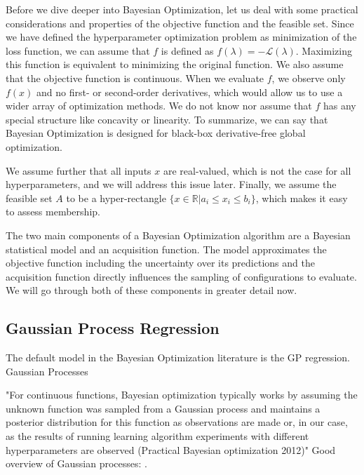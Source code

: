 Before we dive deeper into Bayesian Optimization, let us deal with some practical considerations and properties of the objective function and the feasible set. Since we have defined the hyperparameter optimization problem as minimization of the loss function, we can assume that $f$ is defined as $f(\lambda)=-\mathcal{L}(\lambda)$. Maximizing this function is equivalent to minimizing the original function. We also assume that the objective function is continuous. When we evaluate $f$, we observe only $f(x)$ and no first- or second-order derivatives, which would allow us to use a wider array of optimization methods. We do not know nor assume that $f$ has any special structure like concavity or linearity. To summarize, we can say that Bayesian Optimization is designed for black-box derivative-free global optimization.


We assume further that all inputs $x$ are real-valued, which is not the case for all hyperparameters, and we will address this issue later. Finally, we assume the feasible set $A$ to be a hyper-rectangle $\{ x \in \mathbb{R}| a_i \leq x_i \leq b_i \}$, which makes it easy to assess membership.


The two main components of a Bayesian Optimization algorithm are a Bayesian statistical model and an acquisition function. The model approximates the objective function including the uncertainty over its predictions and the acquisition function directly influences the sampling of configurations to evaluate. We will go through both of these components in greater detail now.


\subsection{Gaussian Process Regression}
The default model in the Bayesian Optimization literature is the GP regression. Gaussian Processes

"For continuous functions, Bayesian optimization typically works by assuming the unknown function was sampled from a Gaussian process and maintains a posterior distribution for this function as observations are made or, in our case, as the results of running learning algorithm experiments with different hyperparameters are observed (Practical Bayesian optimization 2012)"
Good overview of Gaussian processes: \cite{brochu2010tutorial}.

